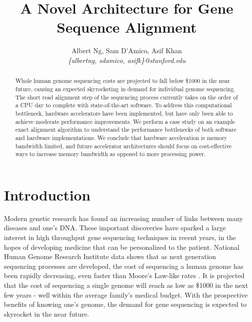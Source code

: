 \documentclass[11pt]{article}
\title{A Novel Architecture for Gene Sequence Alignment}
\author{Albert Ng, Sam D'Amico, Asif Khan\\ \emph{\{albertng, sdamico, asifk\}@stanford.edu}}
\date{}
\begin{document}
\maketitle

\begin{abstract}

%

Whole human genome sequencing costs are projected to fall below \$1000 in the near future, causing an expected skyrocketing in demand for individual genome sequencing.  The short read alignment step of the sequencing process currently takes on the order of a CPU day to complete with state-of-the-art software.  To address this computational bottleneck, hardware accelerators have been implemented, but have only been able to achieve moderate performance improvements.  We perform a case study on an example exact alignment algorithm to understand the performance bottlenecks of both software and hardware implementations.  We conclude that hardware acceleration is memory bandwidth limited, and future accelerator architectures should focus on cost-effective ways to increase memory bandwidth as opposed to more processing power. 

\end{abstract}

%
%

\section{Introduction}
\par
Modern genetic research has found an increasing number of links between many diseases and one's DNA.  These important discoveries have sparked a large interest in high throughput gene sequencing techniques in recent years, in the hopes of developing medicine that can be personalized to the patient.  National Human Genome Research Institute data shows that as next generation sequencing processes are developed, the cost of sequencing a human genome has been rapidly decreasing, even faster than Moore's Law-like rates \cite{wetterstrand2011dna}.  It is projected that the cost of sequencing a single genome will reach as low as \$1000 in the next few years - well within the average family's medical budget.  With the prospective benefits of knowing one's genome, the demand for gene sequencing is expected to skyrocket in the near future.
\end{document}

